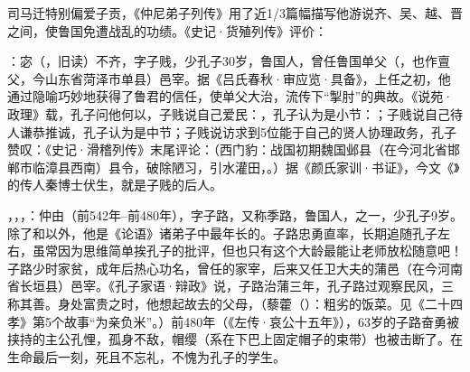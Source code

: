司马迁特别偏爱子贡，《仲尼弟子列传》用了近1/3篇幅描写他游说齐、吴、越、晋之间，使鲁国免遭战乱的功绩。《史记·货殖列传》评价：

：宓（，旧读）不齐，字子贱，少孔子30岁，鲁国人，曾任鲁国单父（，也作亶父，今山东省菏泽市单县）邑宰。据《吕氏春秋·审应览·具备》，上任之初，他通过隐喻巧妙地获得了鲁君的信任，使单父大治，流传下“掣肘”的典故。《说苑·政理》载，孔子问他何以，子贱说自己爱民：，孔子认为是小节：；子贱说自己待人谦恭推诚，孔子认为是中节；子贱说访求到5位能于自己的贤人协理政务，孔子赞叹：《史记·滑稽列传》末尾评论：（西门豹：战国初期魏国邺县（在今河北省邯郸市临漳县西南）县令，破除陋习，引水灌田，。）据《颜氏家训·书证》，今文《》的传人秦博士伏生，就是子贱的后人。%

，，，：仲由（前542年--前480年），字子路，又称季路，鲁国人，之一，少孔子9岁。除了和以外，他是《论语》诸弟子中最年长的。子路忠勇直率，长期追随孔子左右，虽常因为思维简单挨孔子的批评，但也只有这个大龄最能让老师放松随意吧！子路少时家贫，成年后热心功名，曾任的家宰，后来又任卫大夫的蒲邑（在今河南省长垣县）邑宰。《孔子家语·辩政》说，子路治蒲三年，孔子路过观察民风，三称其善。身处富贵之时，他想起故去的父母，（藜藿（）：粗劣的饭菜。见《二十四孝》第5个故事“为亲负米”。）前480年（《左传·哀公十五年》），63岁的子路奋勇被挟持的主公孔悝，孤身不敌，帽缨（系在下巴上固定帽子的束带）也被击断了。在生命最后一刻，死且不忘礼，不愧为孔子的学生。

